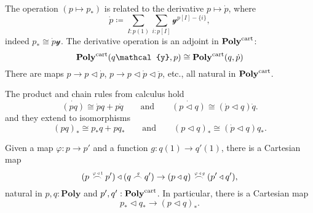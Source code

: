 \documentclass[11pt, one side, article]{memoir}
\theoremstyle{definition}
\theoremstyle{plain}
\newcommand{\Cat}[1]{\mathbf{#1}}%
\newcommand{\tn}[1]{\textnormal{#1}}
\newcommand{\yon}{\mathcal{y}}
\newcommand{\poly}{\Cat{Poly}}
\newcommand{\polycart}{\poly^{\tn{cart}}}
\newcommand{\0}{\textsf{0}}
\newcommand{\1}{\tn{\textsf{1}}}
\newcommand{\tri}{\mathbin{\triangleleft}}
\newcommand{\indexcoclscale}[1]{\scalebox{.7}{#1}}
\newcommand{\cocl}[1]{
	\scriptsize\overset{\,\indexcoclscale{$#1$}}{\frown}\normalsize
}
\newcommand{\qqand}{\qquad\text{and}\qquad}
\begin{document}
The operation $(p\mapsto p_*)$ is related to the derivative $p\mapsto\dot{p}$, where
\begin{equation}
\dot{p}\coloneqq\sum_{I:p(1)}\sum_{i:p[I]}\yon^{p[I]-\{i\}},
\end{equation}
indeed $p_*\cong\dot{p}\yon$. The derivative operation is an adjoint in $\polycart$:
\begin{equation}
  \polycart(q\yon,p)\cong
  \polycart(q,\dot{p})
\end{equation}
There are maps $p\to p\tri\dot{p}$, $p\to p\tri\dot{p}\tri\ddot{p}$, etc., all natural in $\polycart$. 

The product and chain rules from calculus hold
\begin{equation}\label{eqn.calculus}
	\dot{(pq)}\cong \dot{p}q+p\dot{q}
	\qqand
	\dot{(p\tri q)}\cong(\dot{p}\tri q)\dot{q}.
\end{equation}
and they extend to isomorphisms 
\begin{equation}\label{eqn.calculus}
	(pq)_*\cong p_*q+pq_*
	\qqand
	(p\tri q)_*\cong(\dot{p}\tri q)q_*.
\end{equation}

Given a map $\varphi\colon p\to p'$ and a function $g\colon q(1)\to q'(1)$, there is a Cartesian map
\begin{equation}
	(p\cocl{\varphi\tri1}p')\tri(q\cocl{g}q')\to
	(p\tri q)\cocl{\varphi\tri g}(p'\tri q'),
\end{equation}
natural in $p,q:\poly$ and $p',q':\polycart$. In particular, there is a Cartesian map
\begin{equation}
	p_*\tri q_*\to(p\tri q)_*.
\end{equation}
\end{document}

